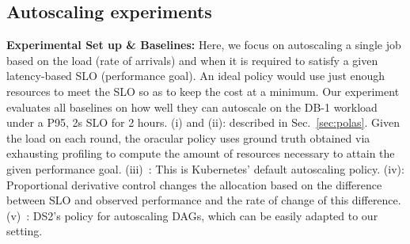
\subsection{Autoscaling experiments}
\label{sec:autoscaling}


\insertFigAutoScaling
\textbf{Experimental Set up \& Baselines:}
Here, we focus on autoscaling a single job based on the load (rate of arrivals) and when it is
required to satisfy a given latency-based SLO (performance goal).
An ideal policy would use just enough resources to meet the SLO so as to keep the cost at a minimum.
Our experiment evaluates all baselines on how well they can autoscale on the DB-1 workload
under a P95, 2s SLO for 2 hours.
% 
% 
(i)\oracleas{} and (ii)\cilantroas: described in Sec.~\ref{sec:polas}.
Given the load on each round, the oracular policy uses ground truth
obtained via exhausting profiling to compute the amount of resources necessary to attain the
given performance goal.
  (iii)\kubeas~\citep{k8sas}: This is Kubernetes' default autoscaling policy.
 (iv)\pdas: Proportional derivative control changes the allocation based on the
difference between SLO and observed performance and the rate of change of this difference.
 (v)\dstwo~\citep{kalavri2018three}:
DS2's policy for autoscaling DAGs, which can be easily adapted to our setting.

